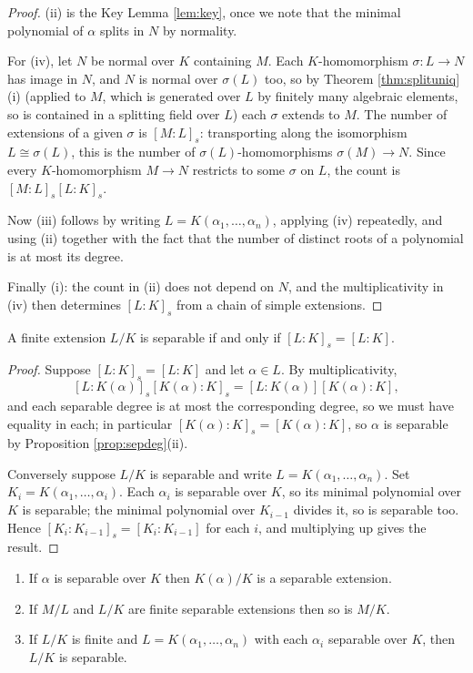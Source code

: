 \documentclass[a4paper]{scrartcl}
\begin{document}
\begin{proof}
	(ii) is the Key Lemma \ref{lem:key}, once we note that the minimal polynomial of $\alpha$ splits in $N$ by normality.

	For (iv), let $N$ be normal over $K$ containing $M$. Each $K$-homomorphism $\sigma : L \to N$ has image in $N$, and $N$ is normal over $\sigma(L)$ too, so by Theorem \ref{thm:splituniq}(i) (applied to $M$, which is generated over $L$ by finitely many algebraic elements, so is contained in a splitting field over $L$) each $\sigma$ extends to $M$. The number of extensions of a given $\sigma$ is $[M:L]_s$: transporting along the isomorphism $L \cong \sigma(L)$, this is the number of $\sigma(L)$-homomorphisms $\sigma(M) \to N$. Since every $K$-homomorphism $M \to N$ restricts to some $\sigma$ on $L$, the count is $[M:L]_s[L:K]_s$.

	Now (iii) follows by writing $L = K(\alpha_1, \dots, \alpha_n)$, applying (iv) repeatedly, and using (ii) together with the fact that the number of distinct roots of a polynomial is at most its degree.

	Finally (i): the count in (ii) does not depend on $N$, and the multiplicativity in (iv) then determines $[L:K]_s$ from a chain of simple extensions.
\end{proof}

\begin{theorem}\label{thm:sepiffdeg}
	A finite extension $L/K$ is separable if and only if $[L:K]_s = [L:K]$.
\end{theorem}

\begin{proof}
	Suppose $[L:K]_s = [L:K]$ and let $\alpha \in L$. By multiplicativity,
	$$[L:K(\alpha)]_s[K(\alpha):K]_s = [L:K(\alpha)][K(\alpha):K],$$
	and each separable degree is at most the corresponding degree, so we must have equality in each; in particular $[K(\alpha):K]_s = [K(\alpha):K]$, so $\alpha$ is separable by Proposition \ref{prop:sepdeg}(ii).

	Conversely suppose $L/K$ is separable and write $L = K(\alpha_1, \dots, \alpha_n)$. Set $K_i = K(\alpha_1, \dots, \alpha_i)$. Each $\alpha_i$ is separable over $K$, so its minimal polynomial over $K$ is separable; the minimal polynomial over $K_{i-1}$ divides it, so is separable too. Hence $[K_i : K_{i-1}]_s = [K_i:K_{i-1}]$ for each $i$, and multiplying up gives the result.
\end{proof}

\begin{corollary}\label{cor:septower}
	\begin{enumerate}[label=(\roman*)]
		\item If $\alpha$ is separable over $K$ then $K(\alpha)/K$ is a separable extension.
		\item If $M/L$ and $L/K$ are finite separable extensions then so is $M/K$.
		\item If $L/K$ is finite and $L = K(\alpha_1, \dots, \alpha_n)$ with each $\alpha_i$ separable over $K$, then $L/K$ is separable.
	\end{enumerate}
\end{corollary}
\end{document}

